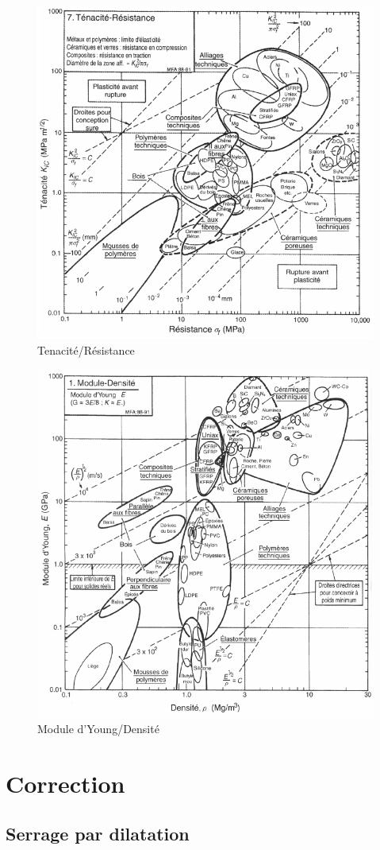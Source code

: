 \begin{figure}[!h] 
  \centering\includegraphics[width=0.6\linewidth]{img/ab3.png}
  \caption{Tenacité/Résistance}
  \label{img:image8}
\end{figure}

\begin{figure}[!ht] 
  \centering\includegraphics[width=0.65\linewidth]{img/ab4.png}
  \caption{Module d'Young/Densité}
  \label{img:image9}
\end{figure}

\ifdef{\public}{}{}

\cleardoublepage

\pagestyle{correction}

\newpage

\section{Correction}

\subsection{Serrage par dilatation}

